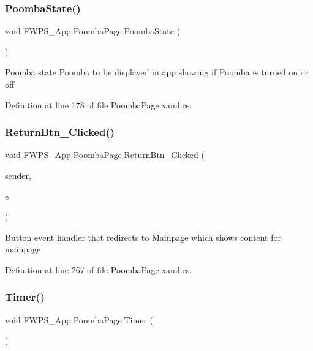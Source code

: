 \subsubsection{\texorpdfstring{Poomba\+State()}{PoombaState()}}
{\footnotesize\ttfamily void F\+W\+P\+S\+\_\+\+App.\+Poomba\+Page.\+Poomba\+State (\begin{DoxyParamCaption}{ }\end{DoxyParamCaption})\hspace{0.3cm}{\ttfamily [private]}}

Poomba state Poomba to be displayed in app showing if Poomba is turned on or off 

Definition at line 178 of file Poomba\+Page.\+xaml.\+cs.

\mbox{\label{class_f_w_p_s___app_1_1_poomba_page_aaab6287e16c9f0714c286680f8b7485f}} 
\subsubsection{\texorpdfstring{Return\+Btn\+\_\+\+Clicked()}{ReturnBtn\_Clicked()}}
{\footnotesize\ttfamily void F\+W\+P\+S\+\_\+\+App.\+Poomba\+Page.\+Return\+Btn\+\_\+\+Clicked (\begin{DoxyParamCaption}\item[{object}]{sender,  }\item[{Event\+Args}]{e }\end{DoxyParamCaption})\hspace{0.3cm}{\ttfamily [private]}}

Button event handler that redirects to Mainpage which shows content for mainpage 

Definition at line 267 of file Poomba\+Page.\+xaml.\+cs.

\mbox{\label{class_f_w_p_s___app_1_1_poomba_page_a17fb5e8e1d1ff86d5a47adc375726817}} 
\subsubsection{\texorpdfstring{Timer()}{Timer()}}
{\footnotesize\ttfamily void F\+W\+P\+S\+\_\+\+App.\+Poomba\+Page.\+Timer (\begin{DoxyParamCaption}{ }\end{DoxyParamCaption})\hspace{0.3cm}{\ttfamily [private]}}



